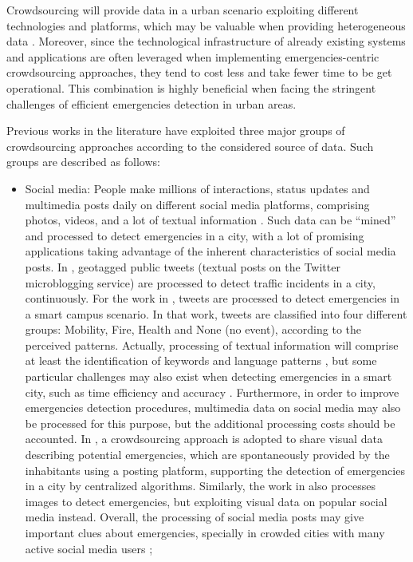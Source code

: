 \begin{refsection}
Crowdsourcing will provide data in a urban scenario exploiting different technologies and platforms, which may be valuable when providing heterogeneous data \cite{crowdsourcing6}. Moreover, since the technological infrastructure of already existing systems and applications are often leveraged when implementing emergencies-centric crowdsourcing approaches, they tend to cost less and take fewer time to be get operational. This combination is highly beneficial when facing the stringent challenges of efficient emergencies detection in urban areas.

Previous works in the literature have exploited three major groups of crowdsourcing approaches according to the considered source of data. Such groups are described as follows:  

\begin{itemize}
  \item Social media: People make millions of interactions, status updates and multimedia posts daily on different social media platforms, comprising photos, videos, and a lot of textual information \cite{socialmedia2}. Such data can be ``mined'' and processed to detect emergencies in a city, with a lot of promising applications taking advantage of the inherent characteristics of social media posts. In \cite{socialmedia3}, geotagged public tweets (textual posts on the Twitter microblogging service) are processed to detect traffic incidents in a city, continuously. For the work in \cite{twitter4}, tweets are processed to detect emergencies in a smart campus scenario. In that work, tweets are classified into four different groups: Mobility, Fire, Health and None (no event), according to the perceived patterns. Actually, processing of textual information will comprise at least the identification of keywords and language patterns \cite{twitter1}, but some particular challenges may also exist when detecting emergencies in a smart city, such as time efficiency and accuracy \cite{socialmediatime1}. Furthermore, in order to improve emergencies detection procedures, multimedia data on social media may also be processed for this purpose, but the additional processing costs should be accounted. In \cite{crowdsourcing5}, a crowdsourcing approach is adopted to share visual data describing potential emergencies, which are spontaneously provided by the inhabitants using a posting platform, supporting the detection of emergencies in a city by centralized algorithms. Similarly, the work in \cite{crowdsourcing7} also processes images to detect emergencies, but exploiting visual data on popular social media instead. Overall, the processing of social media posts may give important clues about emergencies, specially in crowded cities with many active social media users \cite{socialmedia4,twitter4};
  

\end{itemize}
\end{refsection}
